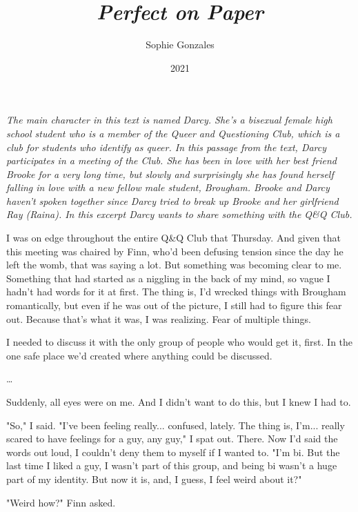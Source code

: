\documentclass[10pt,a4paper]{article}
\begin{document}
\title{\textit{Perfect on Paper}}
\date{2021}
\author{Sophie Gonzales}

\maketitle

\noindent\textit{The main character in this text is named Darcy. She's a bisexual female high school student who is a member of the Queer and Questioning Club, which is a club for students who identify as queer. In this passage from the text, Darcy participates in a meeting of the Club. She has been in love with her best friend Brooke for a very long time, but slowly and surprisingly she has found herself falling in love with a new fellow male student, Brougham. Brooke and Darcy haven't spoken together since Darcy tried to break up Brooke and her girlfriend Ray (Raina). In this excerpt Darcy wants to share something with the Q\&Q Club.}

\bigskip

\noindent\linenumbers I was on edge throughout the entire Q\&Q Club that Thursday. And given that this meeting was chaired by Finn, who'd been defusing tension since the day he left the womb, that was saying a lot. But something was becoming clear to me. Something that had started as a niggling in the back of my mind, so vague I hadn't had words for it at first. The thing is, I'd wrecked things with Brougham romantically, but even if he was out of the picture, I still had to figure this fear out. Because that's what it was, I was realizing. Fear of multiple things.

I needed to discuss it with the only group of people who would get it, first. In the one safe place we'd created where anything could be discussed.

\ldots

Suddenly, all eyes were on me. And I didn't want to do this, but I knew I had to.

"So," I said. "I've been feeling really... confused, lately. The thing is, I'm... really scared to have feelings for a guy, any guy," I spat out. There. Now I'd said the words out loud, I couldn't deny them to myself if I wanted to. "I'm bi. But the last time I liked a guy, I wasn't part of this group, and being bi wasn't a huge part of my identity. But now it is, and, I guess, I feel weird about it?"

"Weird how?" Finn asked.
\end{document}
